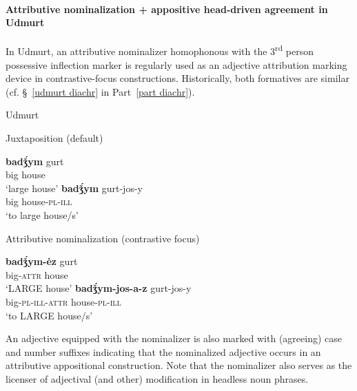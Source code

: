 \paragraph{Attributive nominalization + appositive head-driven agreement in Udmurt} \label{udmurt synchr}
In Udmurt, an attributive nominalizer homophonous with the 3\textsuperscript{rd} person possessive inflection marker is regularly used as an adjective attribution marking device in contrastive-focus constructions. Historically, both formatives are similar (cf. \S~\ref{udmurt diachr} in Part~\ref{part diachr}).
\begin{exe}
\ex \rm{Udmurt \citep{winkler2001}}
\begin{xlist}
\ex \rm{Juxtaposition (default)}
\begin{xlist}
\ex
\gll	\textbf{badǯ́ym} gurt\\
	big house\\
\glt	‘large house’
\ex	
\gll	\textbf{badǯ́ym} gurt-jos-y\\
	big house-\textsc{pl}-\textsc{ill}\\
\glt	‘to large house/s’
\end{xlist}
\ex \rm{Attributive nominalization (contrastive focus)}
\begin{xlist}
\ex
\gll	\textbf{badǯ́ym-ėz} gurt\\
	big-\textsc{attr} house\\
\glt	‘LARGE house’
\ex	
\gll	\textbf{badǯ́ym-jos-a-z} gurt-jos-y\\
	big-\textsc{pl}-\textsc{ill}-\textsc{attr} house-\textsc{pl}-\textsc{ill}\\
\glt	‘to LARGE house/s’
\end{xlist}
\end{xlist}
\end{exe}
An adjective equipped with the nominalizer is also marked with (agreeing) case and number suffixes indicating that the nominalized adjective occurs in an attributive appositional construction. Note that the nominalizer also serves as the licenser of adjectival (and other) modification in headless noun phrases.

